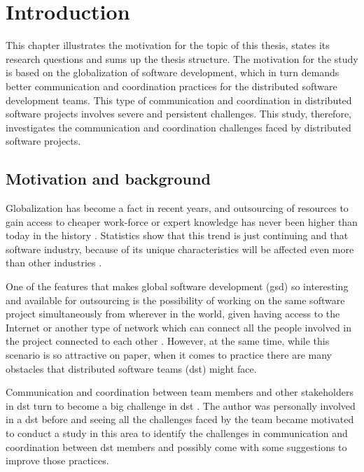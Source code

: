 \chapter{Introduction}
This chapter illustrates the motivation for the topic of this thesis, states its research questions and sums up the thesis structure. The motivation for the study is based on the globalization of software development, which in turn demands better communication and coordination practices for the distributed software development teams. This type of communication and coordination in distributed software projects involves severe and persistent challenges. This study, therefore, investigates the communication and coordination challenges faced by distributed software projects.


\section{Motivation and background}
Globalization has become a fact in recent years, and outsourcing of resources to gain access to cheaper work-force or expert knowledge has never been higher than today in the history \citep{MadonShirinandKrishna2017}. Statistics show that this trend is just continuing and that software industry, because of its unique characteristics will be affected even more than other industries \citep{Sarfraz2016}. 

One of the features that makes global software development (\ac{gsd}) so interesting and available for outsourcing is the possibility of working on the same software project simultaneously from wherever in the world, given having access to the Internet or another type of network which can connect all the people involved in the project connected to each other \citep{Ferguson2004}. However, at the same time, while this scenario is so attractive on paper, when it comes to practice there are many obstacles that distributed software teams (\ac{dst}) might face. 

Communication and coordination between team members and other stakeholders in \ac{dst} turn to become a big challenge in \ac{dst} \citep{Casey2005}. The author was personally involved in a \ac{dst} before and seeing all the challenges faced by the team became motivated to conduct a study in this area to identify the challenges in communication and coordination between \ac{dst} members and possibly come with some suggestions to improve those practices.


